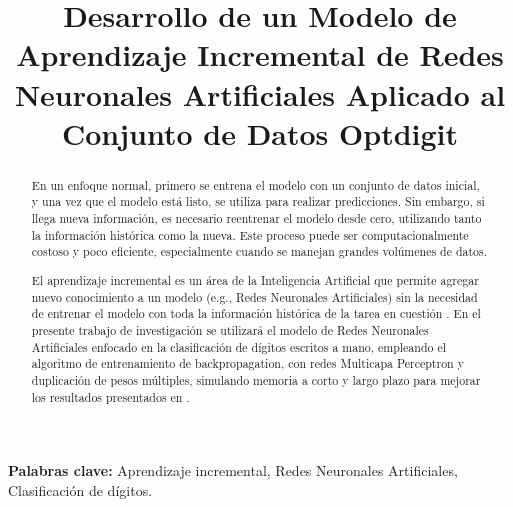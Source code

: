 \documentclass[10pt,a4paper]{article}
\title{Desarrollo de un Modelo de Aprendizaje Incremental de Redes Neuronales Artificiales Aplicado al Conjunto de
Datos Optdigit}
\begin{document}
    
    \tableofcontents
    \listoffigures
    \maketitle
    \begin{abstract}
        En un enfoque normal, primero se entrena el modelo con un conjunto de datos inicial, y una vez que el modelo está listo, se utiliza para realizar predicciones. Sin embargo, si llega nueva información, es necesario reentrenar el modelo desde cero, utilizando tanto la información histórica como la nueva. Este proceso puede ser computacionalmente costoso y poco eficiente, especialmente cuando se manejan grandes volúmenes de datos.
        
        El aprendizaje incremental es un área de la Inteligencia Artificial que permite agregar nuevo conocimiento a un modelo (e.g., Redes Neuronales Artificiales) sin la necesidad de entrenar el modelo con toda la información histórica de la tarea en cuestión \cite{bullinaria2009}. En el presente trabajo de investigación se utilizará el modelo de Redes Neuronales Artificiales enfocado en la clasificación de dígitos escritos a mano, empleando el algoritmo de entrenamiento de backpropagation, con redes Multicapa Perceptron y duplicación de pesos múltiples, simulando memoria a corto y largo plazo para mejorar los resultados presentados en \cite{bullinaria2009}.
        \end{abstract}
        
        \textbf{Palabras clave:} Aprendizaje incremental, Redes Neuronales Artificiales, Clasificación de dígitos.

    
    
    
    
    
    
    
    
    
    
    
    
    
\end{document}
